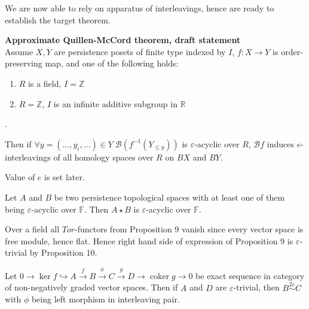 We are now able to rely on apparatus of interleavings, hence are ready to establish the target theorem.\\

\begin{theorem} \textbf{Approximate Quillen-McCord theorem, draft statement}\\
  Assume $X, Y$ are persistence posets of finite type indexed by $I$, $f : X \to Y$ is order-preserving map, and one of the following holds:\\
  \begin{enumerate}
    \item $R$ is a field, $I = \mathbb{Z}$
    \item $R = \mathbb{Z}$, $I$ is an infinite additive subgroup in $\mathbb{R}$
  \end{enumerate}.

  Then if $\forall y=(\ldots,y_i,\ldots) \in Y\;\mathcal{B}(f^{-1}(Y_{\leqslant y}))$ is $\varepsilon$-acyclic over $R$, $\mathcal{B}f$ induces $e$-interleavings of all homology spaces over $R$ on $BX$ and $BY$.\\
\end{theorem}

Value of $e$ is set later.\\

\begin{proposition}
  Let $A$ and $B$ be two persistence topological spaces with at least one of them being $\varepsilon$-acyclic over $\mathbb{F}$. Then $A \star B$ is $\varepsilon$-acyclic over $\mathbb{F}$.
\end{proposition}

\begin{pf}
  Over a field all $Tor$-functors from Proposition 9 vanish since every vector space is free module, hence flat. Hence right hand side of expression of Proposition 9 is $\varepsilon$-trivial by Proposition 10.
\end{pf}

\begin{proposition}
  Let $0 \to \ker{f} \hookrightarrow A \xrightarrow{f} B \xrightarrow{\phi} C \xrightarrow{g} D \to \operatorname{coker}g \to 0$ be exact sequence in category of non-negatively graded vector spaces. Then if $A$ and $D$ are $\varepsilon$-trivial, then $B \stackrel{2\varepsilon}{\sim} C$ with $\phi$ being left morphism in interleaving pair.
\end{proposition}

